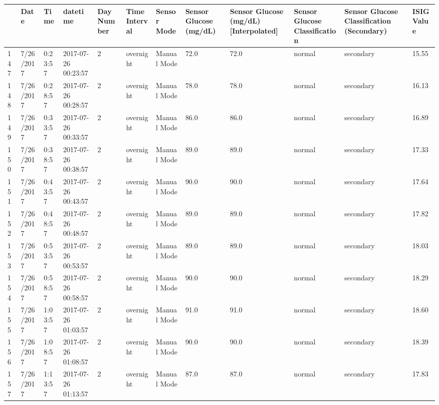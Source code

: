 \bigskip\noindent
\begin{tabular}{p{}p{}p{}p{}p{}p{}p{}p{}p{}p{}p{}p{}}
\toprule
 & Date & Time & datetime & Day Number & Time Interval & Sensor Mode & Sensor Glucose (mg/dL) & Sensor Glucose (mg/dL) [Interpolated] & Sensor Glucose Classification & Sensor Glucose Classification (Secondary) & ISIG Value \\
\hline
147 & 7/26/2017 & 0:23:57 & 2017-07-26 00:23:57 & 2 & overnight & Manual Mode & 72.0 & 72.0 & normal & secondary & 15.55 \\
\hline
148 & 7/26/2017 & 0:28:57 & 2017-07-26 00:28:57 & 2 & overnight & Manual Mode & 78.0 & 78.0 & normal & secondary & 16.13 \\
\hline
149 & 7/26/2017 & 0:33:57 & 2017-07-26 00:33:57 & 2 & overnight & Manual Mode & 86.0 & 86.0 & normal & secondary & 16.89 \\
\hline
150 & 7/26/2017 & 0:38:57 & 2017-07-26 00:38:57 & 2 & overnight & Manual Mode & 89.0 & 89.0 & normal & secondary & 17.33 \\
\hline
151 & 7/26/2017 & 0:43:57 & 2017-07-26 00:43:57 & 2 & overnight & Manual Mode & 90.0 & 90.0 & normal & secondary & 17.64 \\
\hline
152 & 7/26/2017 & 0:48:57 & 2017-07-26 00:48:57 & 2 & overnight & Manual Mode & 89.0 & 89.0 & normal & secondary & 17.82 \\
\hline
153 & 7/26/2017 & 0:53:57 & 2017-07-26 00:53:57 & 2 & overnight & Manual Mode & 89.0 & 89.0 & normal & secondary & 18.03 \\
\hline
154 & 7/26/2017 & 0:58:57 & 2017-07-26 00:58:57 & 2 & overnight & Manual Mode & 90.0 & 90.0 & normal & secondary & 18.29 \\
\hline
155 & 7/26/2017 & 1:03:57 & 2017-07-26 01:03:57 & 2 & overnight & Manual Mode & 91.0 & 91.0 & normal & secondary & 18.60 \\
\hline
156 & 7/26/2017 & 1:08:57 & 2017-07-26 01:08:57 & 2 & overnight & Manual Mode & 90.0 & 90.0 & normal & secondary & 18.39 \\
\hline
157 & 7/26/2017 & 1:13:57 & 2017-07-26 01:13:57 & 2 & overnight & Manual Mode & 87.0 & 87.0 & normal & secondary & 17.83 \\

\end{tabular}
